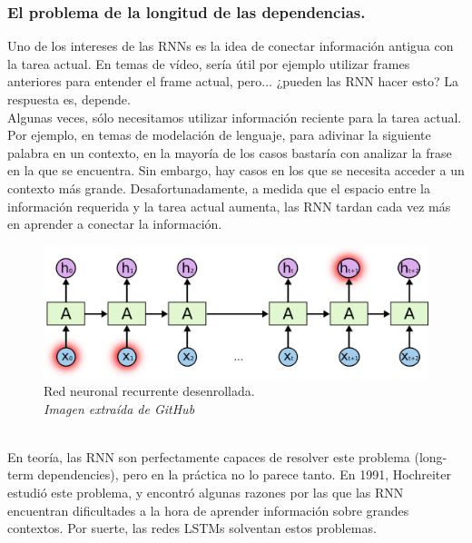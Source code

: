 \subsubsection{El problema de la longitud de las dependencias.}
Uno de los intereses de las RNNs es la idea de conectar información antigua con la tarea actual. En temas de vídeo, sería útil por ejemplo utilizar frames anteriores para entender el frame actual, pero... ¿pueden las RNN hacer esto? La respuesta es, depende.\\
Algunas veces, sólo necesitamos utilizar información reciente para la tarea actual. Por ejemplo, en temas de modelación de lenguaje, para adivinar la siguiente palabra en un contexto, en la mayoría de los casos bastaría con analizar la frase en la que se encuentra. Sin embargo, hay casos en los que se necesita acceder a un contexto más grande. Desafortunadamente, a medida que el espacio entre la información requerida y la tarea actual aumenta, las RNN tardan cada vez más en aprender a conectar la información.\\
\begin{figure}[htp]
\centering
\includegraphics[scale=0.3]{images/RNN-longtermdependencies.png}
\caption{Red neuronal recurrente desenrollada.\\\textit{Imagen extraída de GitHub}}
\end{figure}
\\En teoría, las RNN son perfectamente capaces de resolver este problema (long-term dependencies), pero en la práctica no lo parece tanto. En 1991, Hochreiter estudió este problema, y encontró algunas razones por las que las RNN encuentran dificultades a la hora de aprender información sobre grandes contextos. Por suerte, las redes LSTMs solventan estos problemas.
